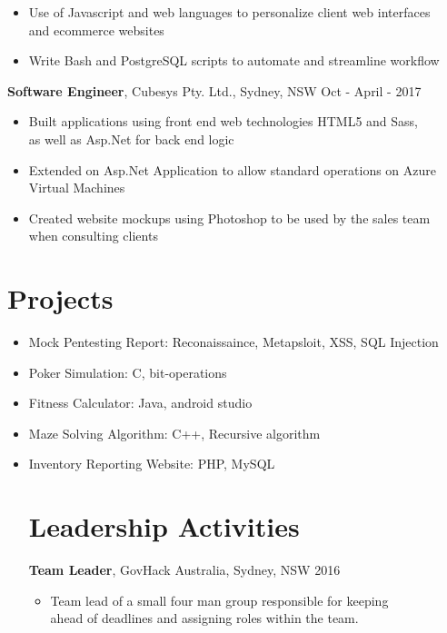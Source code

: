 \documentclass[margin]{res}
\begin{document}
\begin{resume}
\begin{itemize}
\item Use of Javascript and web languages to personalize client web interfaces \\
            and ecommerce websites

\item Write Bash and PostgreSQL scripts to automate and streamline workflow
\end{itemize}

 {\bf Software Engineer}, 
	Cubesys Pty. Ltd., Sydney, NSW \hfill Oct - April - 2017
 \begin{itemize} \itemsep 0pt  %
 \item Built applications using front end web technologies HTML5 and Sass, \\
       as well as Asp.Net for back end logic

 \item Extended on Asp.Net Application to allow standard operations on Azure \\
       Virtual Machines

 \item Created website mockups using Photoshop to be used by the sales team \\
      when consulting clients
 \end{itemize}

\section{Projects}
                  \begin{itemize} \itemsep -2pt
		  \item Mock Pentesting Report: Reconaissaince, Metapsloit, XSS, SQL Injection
                  \item Poker Simulation: C, bit-operations
                  \item Fitness Calculator: Java, android studio
                  \item Maze Solving Algorithm: C++, Recursive algorithm
                  \item Inventory Reporting Website: PHP, MySQL

\section{Leadership   Activities}
               {\bf Team Leader}, GovHack Australia, Sydney, NSW    \hfill        2016
                \begin{itemize} \itemsep -2pt
              \item Team lead of a small four man group responsible for keeping \\
                    ahead of deadlines and assigning roles within the team.


\end{itemize}
\end{itemize}
\end{resume}
\end{document}
